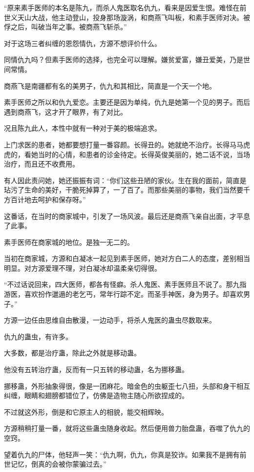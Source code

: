 \begin{this_body}
“原来素手医师的本名是陈九，而杀人鬼医取名仇九，看来是因爱生恨。难怪在前世义天山大战，他主动登山，投身那场漩涡，和商燕飞叫板，和素手医师对决。被俘之后，叫破当年之事。被商燕飞斩杀。”

对于这场三者纠缠的恩怨情仇，方源不想评价什么。

同情仇九吗？但素手医师的选择，也完全可以理解。嫌贫爱富，嫌丑爱美，乃是世间常情。

商燕飞是南疆都有名的美男子，仇九和其相比，简直是一个天一个地。

素手医师之所以和仇九爱恋。主要还是因为单纯，仇九是她第一个见的男子。而后遇到商燕飞，这才开了眼界，有了对比。

况且陈九此人，本性中就有一种对于美的极端追求。

上门求医的患者，她都要想打量一番容颜。长得丑的。她就绝不治疗。长得马马虎虎的，看她当时的心情，和患者的诊金待定。长得英俊美丽的，她二话不说，当场治疗，而且还不收费用。

有人因此责问她，她还振振有词：“你们这些丑陋的家伙。生在我的面前，简直是玷污了生命的美好，干脆死掉算了，一了百了。而那些美丽的事物，我们当然要千方百计地去呵护和保存呀。”

这番话，在当时的商家城中，引发了一场风波。最后还是商燕飞亲自出面，才平息了此事。

素手医师在商家城的地位。是独一无二的。

当初在商家城，方源和白凝冰一起见到素手医师，她对方白二人的态度，差别相当明显。对方源爱理不理，对白凝冰却温柔亲切得很。

“不过话说回来，四大医师，都各有怪癖。杀人鬼医、素手医师且不说了。那九指游医，喜欢扮作邋遢的老乞丐，常年行踪不定。而圣手神医，身为男子。却喜欢男子。”

方源一边任由思维自由散漫，一边动手，将杀人鬼医的蛊虫尽数取来。

仇九的蛊虫，有许多。

大多数，都是治疗蛊，除此之外就是移动蛊。

他没有五转治疗蛊，反而有一只五转的移动蛊，名为挪移蛊。

挪移蛊，外形抽象得很，像是一团麻花。暗金色的虫躯歪七八扭，头部和身干相互纠缠，眼睛和翅膀都错位了，仿佛是造物主随心所欲捏成的。

不过就这外形，倒是和它原主人的相貌，能交相辉映。

方源稍稍打量一番，就将这些蛊虫随身收起。然后便用兽力胎盘蛊，吞噬了仇九的空窍。

望着仇九的尸体，他轻声一笑：“仇九啊，仇九，你真是狡诈。如果我不是拥有前世记忆，倒真的会被你蒙骗过去。”


\end{this_body}
